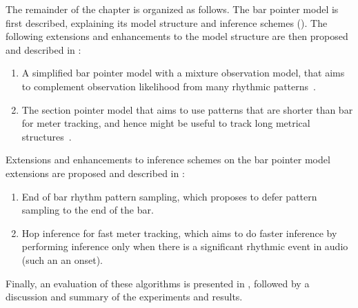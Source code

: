 The remainder of the chapter is organized as follows. The bar pointer model is first described, explaining its model structure and inference schemes (). The following extensions and enhancements to the model structure are then proposed and described in : 
\begin{enumerate}[leftmargin=*,noitemsep]
	\item A simplified bar pointer model with a mixture observation model, that aims to complement observation likelihood from many rhythmic patterns~\cite{ajay:15:pf}.  
	\item The section pointer model that aims to use patterns that are shorter than bar for meter tracking, and hence might be useful to track long metrical structures~\cite{ajay:16:spmodel}.
\end{enumerate}
Extensions and enhancements to inference schemes on the bar pointer model extensions are proposed and described in :
\begin{enumerate}[leftmargin=*,noitemsep]
\item End of bar rhythm pattern sampling, which proposes to defer pattern sampling to the end of the bar. 
\item Hop inference for fast meter tracking, which aims to do faster inference by performing inference only when there is a significant rhythmic event in audio (such an an onset). 
\end{enumerate}
Finally, an evaluation of these algorithms is presented in , followed by a discussion and summary of the experiments and results. 
% 
